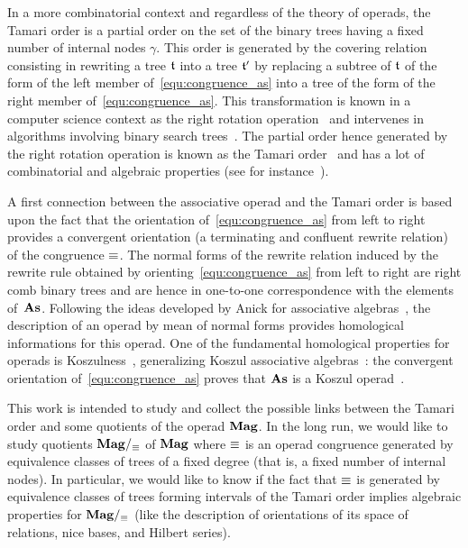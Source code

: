 In a more combinatorial context and regardless of the theory of operads,
the Tamari order is a partial order on the set of the binary trees
having a fixed number of internal nodes $\gamma$. This order is
generated by the covering relation consisting in rewriting a tree $\mathfrak{t}$
into a tree $\mathfrak{t}'$ by replacing a subtree of $\mathfrak{t}$ of the form of the
left member of~\eqref{equ:congruence_as} into a tree of the form of the
right member of~\eqref{equ:congruence_as}. This transformation is known
in a computer science context as the right rotation
operation~\cite{Knu98} and intervenes in algorithms involving binary
search trees~\cite{AVL62}. The partial order hence generated by the
right rotation operation is known as the Tamari order~\cite{Tam62} and
has a lot of combinatorial and algebraic properties (see for
instance~\cite{HT72,Cha06}).
\medbreak

A first connection between the associative operad and the Tamari order
is based upon the fact that the orientation of~\eqref{equ:congruence_as}
from left to right provides a convergent orientation (a terminating and
confluent rewrite relation) of the congruence $\operatorname{\equiv}$. The normal
forms of the rewrite relation induced by the rewrite rule obtained by
orienting~\eqref{equ:congruence_as} from left to right are right comb
binary trees and are hence in one-to-one correspondence with the
elements of~$\mathbf{As}$. Following the ideas developed by Anick for
associative algebras~\cite{Ani86}, the description of an operad by mean
of normal forms provides homological informations for this operad. One of
the fundamental homological properties for operads is
Koszulness~\cite{GK94}, generalizing Koszul associative
algebras~\cite{Pri70}: the convergent orientation
of~\eqref{equ:congruence_as} proves that $\mathbf{As}$ is a Koszul
operad~\cite{DK10,LV12}.
\medbreak

This work is intended to study and collect the possible links between
the Tamari order and some quotients of the operad $\mathbf{Mag}$. In the long
run, we would like to study quotients $\mathbf{Mag}/_{\operatorname{\equiv}}$ of $\mathbf{Mag}$ where
$\operatorname{\equiv}$ is an operad congruence generated by equivalence classes of
trees of a fixed degree (that is, a fixed number of internal nodes). In
particular, we would like to know if the fact that $\operatorname{\equiv}$ is generated
by equivalence classes of trees forming intervals of the Tamari order
implies algebraic properties for $\mathbf{Mag}/_{\operatorname{\equiv}}$ (like the description
of orientations of its space of relations, nice bases, and Hilbert
series).
\medbreak

